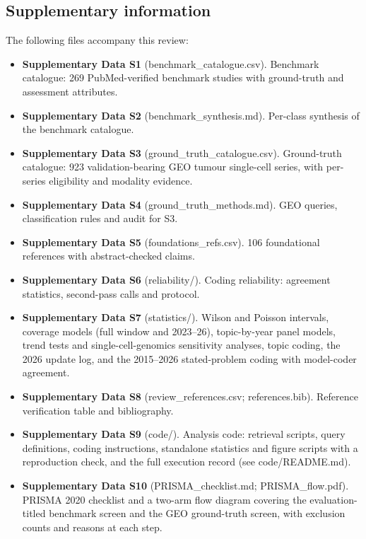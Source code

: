 \documentclass[11pt]{article}
\providecommand{\tightlist}{\setlength{\itemsep}{0pt}\setlength{\parskip}{0pt}}
\begin{document}
\subsection{Supplementary information}\label{supplementary-information}

The following files accompany this review:

\begin{itemize}
\tightlist
\item
  \textbf{Supplementary Data S1} (benchmark\_catalogue.csv). Benchmark
  catalogue: 269 PubMed-verified benchmark studies with ground-truth and
  assessment attributes.
\item
  \textbf{Supplementary Data S2} (benchmark\_synthesis.md). Per-class
  synthesis of the benchmark catalogue.
\item
  \textbf{Supplementary Data S3} (ground\_truth\_catalogue.csv).
  Ground-truth catalogue: 923 validation-bearing GEO tumour single-cell
  series, with per-series eligibility and modality evidence.
\item
  \textbf{Supplementary Data S4} (ground\_truth\_methods.md). GEO
  queries, classification rules and audit for S3.
\item
  \textbf{Supplementary Data S5} (foundations\_refs.csv). 106
  foundational references with abstract-checked claims.
\item
  \textbf{Supplementary Data S6} (reliability/). Coding reliability:
  agreement statistics, second-pass calls and protocol.
\item
  \textbf{Supplementary Data S7} (statistics/). Wilson and Poisson
  intervals, coverage models (full window and 2023--26), topic-by-year
  panel models, trend tests and single-cell-genomics sensitivity
  analyses, topic coding, the 2026 update log, and the 2015--2026
  stated-problem coding with model-coder agreement.
\item
  \textbf{Supplementary Data S8} (review\_references.csv;
  references.bib). Reference verification table and bibliography.
\item
  \textbf{Supplementary Data S9} (code/). Analysis code: retrieval
  scripts, query definitions, coding instructions, standalone statistics
  and figure scripts with a reproduction check, and the full execution
  record (see code/README.md).
\item
  \textbf{Supplementary Data S10} (PRISMA\_checklist.md;
  PRISMA\_flow.pdf). PRISMA 2020 checklist and a two-arm flow diagram
  covering the evaluation-titled benchmark screen and the GEO
  ground-truth screen, with exclusion counts and reasons at each step.
\end{itemize}
\end{document}
